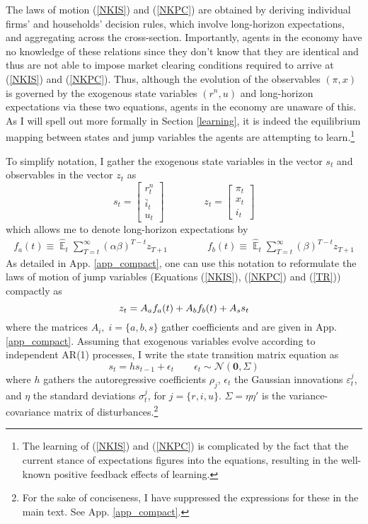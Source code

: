 \documentclass[11pt]{article}
\renewcommand{\[}{\begin{equation}}
\renewcommand{\]}{\end{equation}}
\DeclareMathOperator{\E}{\mathbb{E}}
\begin{document}
The laws of motion (\ref{NKIS}) and (\ref{NKPC}) are obtained by deriving individual firms' and households' decision rules, which involve long-horizon expectations, and aggregating across the cross-section. Importantly, agents in the economy have no knowledge of these relations since they don't know that they are identical and thus are not able to impose market clearing conditions required to arrive at (\ref{NKIS}) and (\ref{NKPC}). Thus, although the evolution of the observables $(\pi,x)$ is governed by the exogenous state variables $(r^n, u)$ and long-horizon expectations via these two equations, agents in the economy are unaware of this. As I will spell out more formally in Section \ref{learning}, it is indeed the equilibrium mapping between states and jump variables the agents are attempting to learn.\footnote{The learning of (\ref{NKIS}) and (\ref{NKPC}) is complicated by the fact that the current stance of expectations figures into the equations, resulting in the well-known positive feedback effects of learning.} 

To simplify notation, I gather the exogenous state variables in the vector $s_t$ and observables in the vector $z_t$ as
\begin{equation}
s_t =  \begin{bmatrix}r_t^n \\ \bar{i}_t \\ u_t \end{bmatrix} \quad \quad \quad \quad  z_t = \begin{bmatrix}\pi_t \\ x_t \\ i_t \end{bmatrix}
\end{equation}
which allows me to denote long-horizon expectations by 
 \begin{align}
f_a(t)  \equiv  \hat{\E}_t\sum_{T=t}^{\infty} (\alpha\beta)^{T-t } z_{T+1} \quad \quad \quad \quad f_b(t)  \equiv \hat{\E}_t\sum_{T=t}^{\infty} (\beta)^{T-t } z_{T+1} \label{fafb}
\end{align}
As detailed in App. \ref{app_compact}, one can use this notation to reformulate the laws of motion of jump variables (Equations (\ref{NKIS}), (\ref{NKPC}) and (\ref{TR})) compactly as
\begin{equation}
z_t  = A_af_a(t) + A_b f_b(t) + A_s s_t \label{LOM_LR} \\
\end{equation}
where the matrices $A_i, \; i=\{a,b,s\}$ gather coefficients and are given in App. \ref{app_compact}. Assuming that exogenous variables evolve according to independent AR(1) processes, I write the state transition matrix equation as
 \begin{equation}
 s_t  = h s_{t-1} + \epsilon_t  \quad \quad \epsilon_t \sim \mathcal{N}(\mathbf{0}, \Sigma) \label{LOM_s}
 \end{equation}
where $h$ gathers the autoregressive coefficients $\rho_j$, $\epsilon_t$ the Gaussian innovations $\varepsilon_t^j$, and $\eta$ the standard deviations $\sigma_t^j$, for $j=\{r,i,u\}$. $\Sigma = \eta \eta'$  is the variance-covariance matrix of disturbances.\footnote{For the sake of conciseness, I have suppressed the expressions for these in the main text. See App. \ref{app_compact}.}
\end{document}
